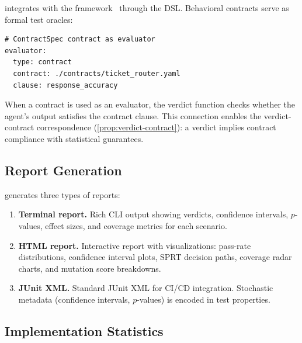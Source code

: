 \agentassay{} integrates with the \agentassert{}
framework~\citep{bhardwaj2026abc} through the \contractspec{} DSL.
Behavioral contracts serve as formal test oracles:

\begin{verbatim}
# ContractSpec contract as evaluator
evaluator:
  type: contract
  contract: ./contracts/ticket_router.yaml
  clause: response_accuracy
\end{verbatim}

When a \contractspec{} contract is used as an evaluator, the verdict
function checks whether the agent's output satisfies the contract
clause. This connection enables the verdict-contract correspondence
(\cref{prop:verdict-contract}): a \PASS{} verdict implies contract
compliance with statistical guarantees.

\subsection{Report Generation}
\label{sec:implementation:reports}

\agentassay{} generates three types of reports:

\begin{enumerate}[leftmargin=*]
  \item \textbf{Terminal report.} Rich CLI output showing verdicts,
    confidence intervals, $p$-values, effect sizes, and coverage metrics
    for each scenario.

  \item \textbf{HTML report.} Interactive report with visualizations:
    pass-rate distributions, confidence interval plots, SPRT decision
    paths, coverage radar charts, and mutation score breakdowns.

  \item \textbf{JUnit XML.} Standard JUnit XML for CI/CD integration.
    Stochastic metadata (confidence intervals, $p$-values) is encoded in
    test properties.
\end{enumerate}

\subsection{Implementation Statistics}
\label{sec:implementation:stats}

